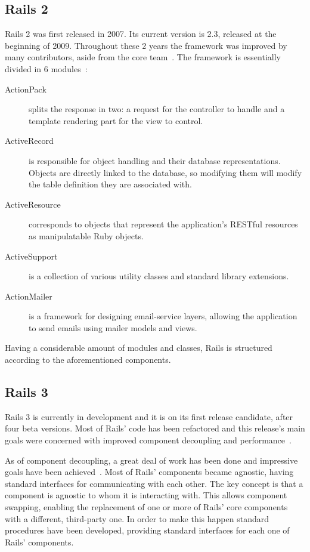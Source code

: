 \subsection{Rails 2}
\label{tech:sec:ruby_on_rails:rails2}
Rails 2 was first released in 2007. Its current version is 2.3, released at the beginning of 2009. Throughout these 2 years the framework was improved by many contributors, aside from the core team~\cite{rails_core_team}. The framework is essentially divided in 6 modules~\cite{ruby_on_rails_principles, rails23_release_notes}:
\begin{description}
\item[ActionPack] splits the response in two:  a request for the controller to handle and a template rendering part for the view to control.
\item[ActiveRecord] is responsible for object handling and their database representations. Objects are directly linked to the database, so modifying them will modify the table definition they are associated with.
\item[ActiveResource] corresponds to objects that represent the application's RESTful resources as manipulatable Ruby objects.
\item[ActiveSupport] is a collection of various utility classes and standard library extensions.
\item[ActionMailer] is a framework for designing email-service layers, allowing the application to send emails using mailer models and views.
\end{description}
Having a considerable amount of modules and classes, Rails is structured according to the aforementioned components.


\subsection{Rails 3}
\label{tech:sec:ruby_on_rails:rails3}
Rails 3 is currently in development and it is on its first release candidate, after four beta versions. Most of Rails' code has been refactored and this release's main goals were concerned with improved component decoupling and performance~\cite{rails3_great_decoupling}. 

As of component decoupling, a great deal of work has been done and impressive goals have been achieved~\cite{vaporware_to_awesome}. Most of Rails' components became agnostic, having standard interfaces for communicating with each other. The key concept is that a component is agnostic to whom it is interacting with. This allows component swapping, enabling the replacement of one or more of Rails' core components with a different, third-party one. In order to make this happen standard procedures have been developed, providing standard interfaces for each one of Rails' components.

